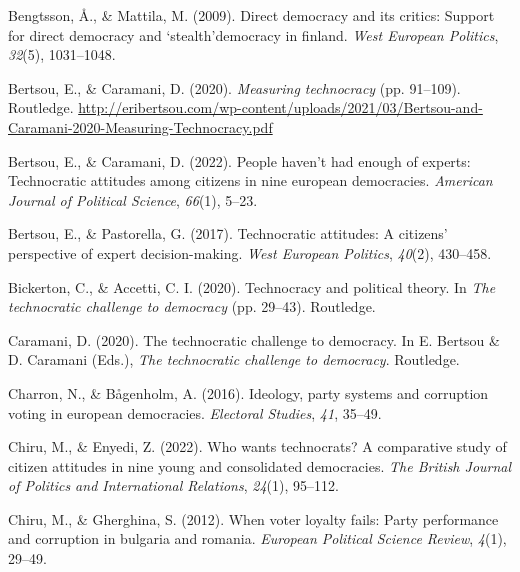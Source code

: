 \documentclass[
  12pt,
  english,
]{article}
\newlength{\cslhangindent}
\newlength{\cslentryspacingunit} %
\newenvironment{CSLReferences}[2] %
 {%
  \setlength{\parindent}{0pt}
  \ifodd #1
  \let\oldpar\par
  \def\par{\hangindent=\cslhangindent\oldpar}
  \fi
  \setlength{\parskip}{#2\cslentryspacingunit}
 }%
 {}
\begin{document}
\hypertarget{refs}{}
\begin{CSLReferences}{1}{0}
\leavevmode{}%
Bengtsson, Å., \& Mattila, M. (2009). Direct democracy and its critics:
Support for direct democracy and `stealth'democracy in finland.
\emph{West European Politics}, \emph{32}(5), 1031--1048.

\leavevmode{}%
Bertsou, E., \& Caramani, D. (2020). \emph{Measuring technocracy} (pp.
91--109). Routledge.
\url{http://eribertsou.com/wp-content/uploads/2021/03/Bertsou-and-Caramani-2020-Measuring-Technocracy.pdf}

\leavevmode{}%
Bertsou, E., \& Caramani, D. (2022). People haven't had enough of
experts: Technocratic attitudes among citizens in nine european
democracies. \emph{American Journal of Political Science}, \emph{66}(1),
5--23.

\leavevmode{}%
Bertsou, E., \& Pastorella, G. (2017). Technocratic attitudes: A
citizens' perspective of expert decision-making. \emph{West European
Politics}, \emph{40}(2), 430--458.

\leavevmode{}%
Bickerton, C., \& Accetti, C. I. (2020). Technocracy and political
theory. In \emph{The technocratic challenge to democracy} (pp. 29--43).
Routledge.

\leavevmode{}%
Caramani, D. (2020). The technocratic challenge to democracy. In E.
Bertsou \& D. Caramani (Eds.), \emph{The technocratic challenge to
democracy}. Routledge.

\leavevmode{}%
Charron, N., \& Bågenholm, A. (2016). Ideology, party systems and
corruption voting in european democracies. \emph{Electoral Studies},
\emph{41}, 35--49.

\leavevmode{}%
Chiru, M., \& Enyedi, Z. (2022). Who wants technocrats? A comparative
study of citizen attitudes in nine young and consolidated democracies.
\emph{The British Journal of Politics and International Relations},
\emph{24}(1), 95--112.

\leavevmode{}%
Chiru, M., \& Gherghina, S. (2012). When voter loyalty fails: Party
performance and corruption in bulgaria and romania. \emph{European
Political Science Review}, \emph{4}(1), 29--49.


\end{CSLReferences}
\end{document}
